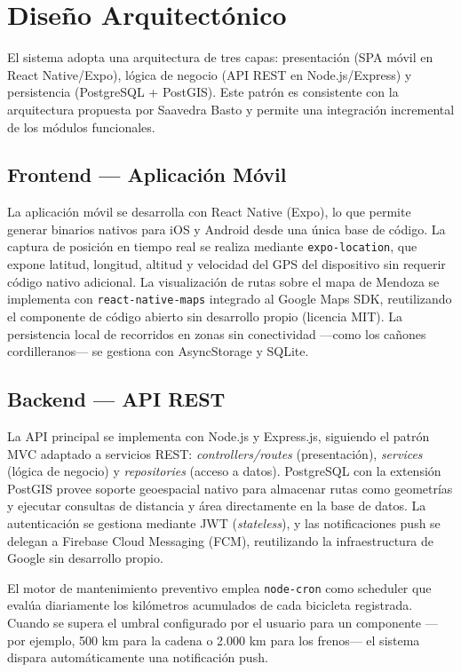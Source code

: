 \documentclass{llncs}
\begin{document}
\section{Diseño Arquitectónico}

El sistema adopta una arquitectura de tres capas: presentación (SPA móvil en React Native/Expo), lógica de negocio (API REST en Node.js/Express) y persistencia (PostgreSQL + PostGIS). Este patrón es consistente con la arquitectura propuesta por Saavedra Basto \cite{Saavedra2022} y permite una integración incremental de los módulos funcionales.

\subsection{Frontend — Aplicación Móvil}

La aplicación móvil se desarrolla con React Native (Expo), lo que permite generar binarios nativos para iOS y Android desde una única base de código. La captura de posición en tiempo real se realiza mediante \texttt{expo-location}, que expone latitud, longitud, altitud y velocidad del GPS del dispositivo sin requerir código nativo adicional. La visualización de rutas sobre el mapa de Mendoza se implementa con \texttt{react-native-maps} integrado al Google Maps SDK, reutilizando el componente de código abierto sin desarrollo propio (licencia MIT). La persistencia local de recorridos en zonas sin conectividad —como los cañones cordilleranos— se gestiona con AsyncStorage y SQLite.

\subsection{Backend — API REST}

La API principal se implementa con Node.js y Express.js, siguiendo el patrón MVC adaptado a servicios REST: \textit{controllers/routes} (presentación), \textit{services} (lógica de negocio) y \textit{repositories} (acceso a datos). PostgreSQL con la extensión PostGIS provee soporte geoespacial nativo para almacenar rutas como geometrías y ejecutar consultas de distancia y área directamente en la base de datos. La autenticación se gestiona mediante JWT (\textit{stateless}), y las notificaciones push se delegan a Firebase Cloud Messaging (FCM), reutilizando la infraestructura de Google sin desarrollo propio.

El motor de mantenimiento preventivo emplea \texttt{node-cron} como scheduler que evalúa diariamente los kilómetros acumulados de cada bicicleta registrada. Cuando se supera el umbral configurado por el usuario para un componente —por ejemplo, 500 km para la cadena o 2.000 km para los frenos— el sistema dispara automáticamente una notificación push.
\end{document}
